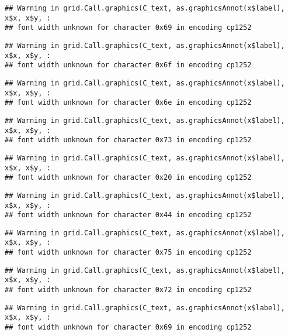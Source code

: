 \documentclass[
]{article}
\begin{document}
\begin{verbatim}
## Warning in grid.Call.graphics(C_text, as.graphicsAnnot(x$label), x$x, x$y, :
## font width unknown for character 0x69 in encoding cp1252
\end{verbatim}

\begin{verbatim}
## Warning in grid.Call.graphics(C_text, as.graphicsAnnot(x$label), x$x, x$y, :
## font width unknown for character 0x6f in encoding cp1252
\end{verbatim}

\begin{verbatim}
## Warning in grid.Call.graphics(C_text, as.graphicsAnnot(x$label), x$x, x$y, :
## font width unknown for character 0x6e in encoding cp1252
\end{verbatim}

\begin{verbatim}
## Warning in grid.Call.graphics(C_text, as.graphicsAnnot(x$label), x$x, x$y, :
## font width unknown for character 0x73 in encoding cp1252
\end{verbatim}

\begin{verbatim}
## Warning in grid.Call.graphics(C_text, as.graphicsAnnot(x$label), x$x, x$y, :
## font width unknown for character 0x20 in encoding cp1252
\end{verbatim}

\begin{verbatim}
## Warning in grid.Call.graphics(C_text, as.graphicsAnnot(x$label), x$x, x$y, :
## font width unknown for character 0x44 in encoding cp1252
\end{verbatim}

\begin{verbatim}
## Warning in grid.Call.graphics(C_text, as.graphicsAnnot(x$label), x$x, x$y, :
## font width unknown for character 0x75 in encoding cp1252
\end{verbatim}

\begin{verbatim}
## Warning in grid.Call.graphics(C_text, as.graphicsAnnot(x$label), x$x, x$y, :
## font width unknown for character 0x72 in encoding cp1252
\end{verbatim}

\begin{verbatim}
## Warning in grid.Call.graphics(C_text, as.graphicsAnnot(x$label), x$x, x$y, :
## font width unknown for character 0x69 in encoding cp1252
\end{verbatim}
\end{document}
